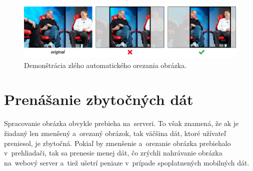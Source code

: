 \begin{figure}[!ht]
	\centering
	\includegraphics[width=\textwidth]{jobs_gates}
	\caption{Demonštrácia zlého automatického orezania obrázka.}
	\label{fig:jg_image}
\end{figure}


\section{Prenášanie zbytočných dát}

Spracovanie obrázka obvykle prebieha na~serveri. To však znamená, že ak je žiadaný len zmenšený a~orezaný obrázok, tak väčšina dát, ktoré užívateľ preniesol, je zbytočná. Pokiaľ by zmenšenie a~orezanie obrázka prebiehalo v~prehliadači, tak sa prenesie menej dát, čo zrýchli nahrávanie obrázka na~webový server a~tiež ušetrí peniaze v~prípade spoplatnených mobilných dát.

